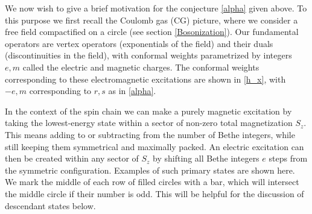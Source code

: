 \documentclass[a4paper,10pt]{article}
\newcommand{\hubert}[1]{$\framebox{\tiny h}$\ \textbf{\texttt{{\color{blue}\footnotesize#1}}}}
\newcommand{\linnea}[1]{$\framebox{\tiny L}$\ \textbf{\texttt{{\color{red}\footnotesize#1}}}}
\begin{document}
We now wish to give a brief motivation for the conjecture \eqref{alpha} given above. To this purpose we first recall the Coulomb gas (CG) picture, where we consider a free field compactified on a circle (see section \ref{Bosonization}). Our fundamental operators are vertex operators (exponentials of the field) and their duals (discontinuities in the field), with conformal weights parametrized by integers $e,m$ called the electric and magnetic charges. The  conformal weights corresponding to these electromagnetic excitations are shown in \eqref{h_x}, with $-e,m$ corresponding to $r,s$ as in \eqref{alpha}. 



In the context of the spin chain we can make a purely magnetic excitation by taking the lowest-energy state within a sector of non-zero total magnetization $S_z$. This means adding to or subtracting from the number of Bethe integers, while still keeping them symmetrical and maximally packed. An electric excitation can then be created within any sector of $S_z$ by shifting all Bethe integers $e$ steps from the symmetric configuration. Examples of such primary states are shown here. We mark the middle of each row of filled circles with a bar, which will intersect the middle circle if their number is odd. This will be helpful for the discussion of descendant states below.
\end{document}
